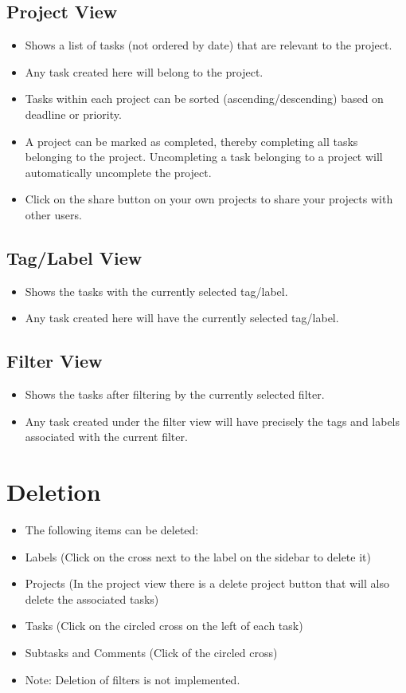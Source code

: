 \documentclass{article}
\begin{document}
\subsection{Project View}
\begin{itemize}
  \item Shows a list of tasks (not ordered by date) that are relevant to the project.
  \item Any task created here will belong to the project.
  \item Tasks within each project can be sorted (ascending/descending) based on deadline or priority.
  \item A project can be marked as completed, thereby completing all tasks belonging to the project. Uncompleting a task belonging to a project will automatically uncomplete the project.
  \item Click on the share button on your own projects to share your projects with other users.
\end{itemize}



\subsection{Tag/Label View}
\begin{itemize}
  \item Shows the tasks with the currently selected tag/label.
  \item Any task created here will have the currently selected tag/label.
\end{itemize}


\subsection{Filter View}
\begin{itemize}
  \item Shows the tasks after filtering by the currently selected filter.
  \item Any task created under the filter view will have precisely the tags and labels associated with the current filter. 
\end{itemize}

\section{Deletion}
\begin{itemize}
  \item The following items can be deleted:
  \item Labels (Click on the cross next to the label on the sidebar to delete it)
  \item Projects (In the project view there is a delete project button that will also delete the associated tasks)
  \item Tasks (Click on the circled cross on the left of each task)
  \item Subtasks and Comments (Click of the circled cross)
  \item Note: Deletion of filters is not implemented.
\end{itemize}
\end{document}
